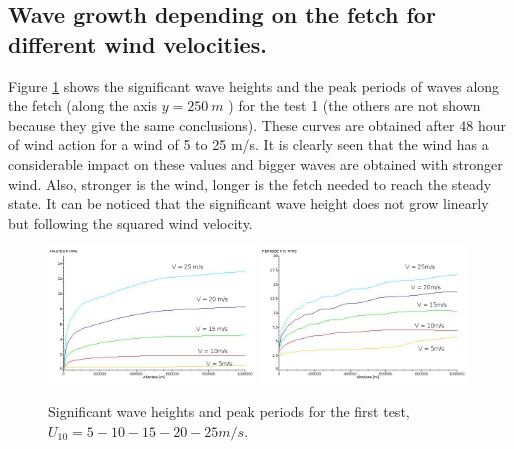 \subsection{Wave growth depending on the fetch for different wind velocities.}
Figure \ref{hsfet} shows the significant wave heights and the peak periods of
waves along the fetch (along the axis $ y = 250~m$ ) for the test 1 (the others
are not shown because they give the same conclusions). These curves are
obtained after 48 hour of wind action for a wind of 5 to 25 m/s. It is clearly
seen that the wind has a considerable impact on these values and bigger waves
are obtained with stronger wind. Also, stronger is the wind, longer is the
fetch needed to reach the steady state. It can be noticed that the significant
wave height does not grow linearly but following the squared wind velocity.
\begin{figure}[H]
  \centering
  \includegraphics[width=0.49\textwidth]{Hm0_free_mesh.jpg}
  \includegraphics[width=0.49\textwidth]{Tp_free_mesh.jpg}
  \caption{Significant wave heights and peak periods for the first test,
    $U_{10} = 5 - 10 - 15 - 20 - 25 m/s$.}
\label{hsfet}
\end{figure}
